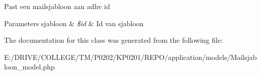 Past een mailsjabloon aan adhv id 
\begin{DoxyParams}[1]{Parameters}
sjabloon & {\em \$id} & Id van sjabloon \\
\hline
\end{DoxyParams}


The documentation for this class was generated from the following file\+:\begin{DoxyCompactItemize}
\item 
E\+:/\+D\+R\+I\+V\+E/\+C\+O\+L\+L\+E\+G\+E/\+T\+M/\+P0202/\+K\+P0201/\+R\+E\+P\+O/application/models/Mailsjabloon\+\_\+model.\+php\end{DoxyCompactItemize}
